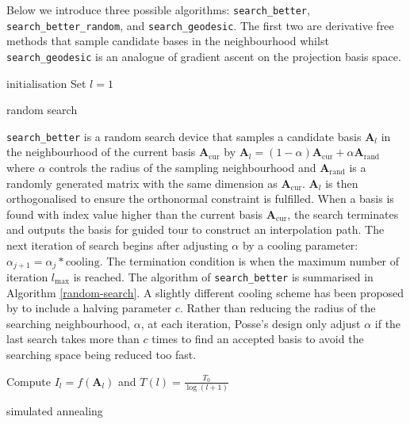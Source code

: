 \documentclass[12pt]{article}
\begin{document}
Below we introduce three possible algorithms: \texttt{search\_better}, \texttt{search\_better\_random}, and \texttt{search\_geodesic}. The first two are derivative free methods that sample candidate bases in the neighbourhood whilst \texttt{search\_geodesic} is an analogue of gradient ascent on the projection basis space.

\begin{algorithm}
\SetAlgoLined
  initialisation\;
  Set $l = 1$\;
  \caption{random search}
  \label{random-search}
\end{algorithm}

\texttt{search\_better} is a random search device that samples a candidate basis \(\mathbf{A}_{l}\) in the neighbourhood of the current basis \(\mathbf{A}_{\text{cur}}\) by \(\mathbf{A}_{l} = (1- \alpha)\mathbf{A}_{\text{cur}} + \alpha \mathbf{A}_{\text{rand}}\) where \(\alpha\) controls the radius of the sampling neighbourhood and \(\mathbf{A}_{\text{rand}}\) is a randomly generated matrix with the same dimension as \(\mathbf{A}_{\text{cur}}\). \(\mathbf{A}_{l}\) is then orthogonalised to ensure the orthonormal constraint is fulfilled. When a basis is found with index value higher than the current basis \(\mathbf{A}_{\text{cur}}\), the search terminates and outputs the basis for guided tour to construct an interpolation path. The next iteration of search begins after adjusting \(\alpha\) by a cooling parameter: \(\alpha_{j+1} = \alpha_j * \text{cooling}\). The termination condition is when the maximum number of iteration \(l_{\max}\) is reached. The algorithm of \texttt{search\_better} is summarised in Algorithm \ref{random-search}. A slightly different cooling scheme has been proposed by \citet{posse1995projection} to include a halving parameter \(c\). Rather than reducing the radius of the searching neighbourhood, \(\alpha\), at each iteration, Posse's design only adjust \(\alpha\) if the last search takes more than \(c\) times to find an accepted basis to avoid the searching space being reduced too fast.

\begin{algorithm}
\SetAlgoLined
    Compute $I_{l} = f(\mathbf{A}_{l})$ and $T(l) = \frac{T_0}{\log(l + 1)}$\;
  \caption{simulated annealing}
  \label{simulated_annealing}
\end{algorithm}
\end{document}
